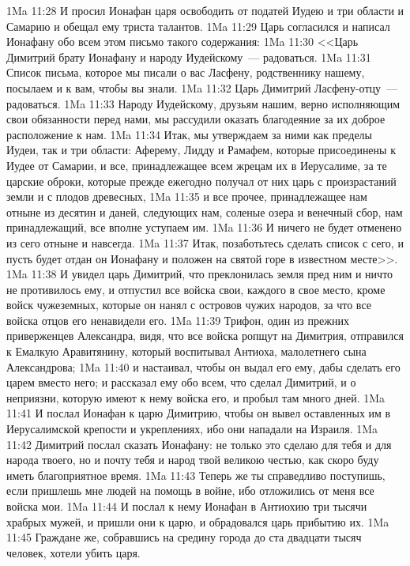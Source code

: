 \vs 1Ma 11:28 И просил Ионафан царя освободить от податей Иудею и три области и Самарию и обещал ему триста талантов.
\vs 1Ma 11:29 Царь согласился и написал Ионафану обо всем этом письмо такого содержания:
\vs 1Ma 11:30 <<Царь Димитрий брату Ионафану и народу Иудейскому~--- радоваться.
\vs 1Ma 11:31 Список письма, которое мы писали о вас Ласфену, родственнику нашему, посылаем и к вам, чтобы вы знали.
\vs 1Ma 11:32 Царь Димитрий Ласфену-отцу~--- радоваться.
\vs 1Ma 11:33 Народу Иудейскому, друзьям нашим, верно исполняющим свои обязанности перед нами, мы рассудили оказать благодеяние за их доброе расположение к нам.
\vs 1Ma 11:34 Итак, мы утверждаем за ними как пределы Иудеи, так и три области: Аферему, Лидду и Рамафем, которые присоединены к Иудее от Самарии, и все, принадлежащее всем жрецам их в Иерусалиме, за те царские оброки, которые прежде ежегодно получал от них царь с произрастаний земли и с плодов древесных,
\vs 1Ma 11:35 и все прочее, принадлежащее нам отныне из десятин и даней, следующих нам, соленые озера и венечный сбор, нам принадлежащий, все вполне уступаем им.
\vs 1Ma 11:36 И ничего не будет отменено из сего отныне и навсегда.
\vs 1Ma 11:37 Итак, позаботьтесь сделать список с сего, и пусть будет отдан он Ионафану и положен на святой горе в известном месте>>.
\rsbpar\vs 1Ma 11:38 И увидел царь Димитрий, что преклонилась земля пред ним и ничто не противилось ему, и отпустил все войска свои, каждого в свое место, кроме войск чужеземных, которые он нанял с островов чужих народов, за что все войска отцов его ненавидели его.
\vs 1Ma 11:39 Трифон, один из прежних приверженцев Александра, видя, что все войска ропщут на Димитрия, отправился к Емалкую Аравитянину, который воспитывал Антиоха, малолетнего сына Александрова;
\vs 1Ma 11:40 и настаивал, чтобы он выдал его ему, дабы сделать его царем вместо него; и рассказал ему обо всем, что сделал Димитрий, и о неприязни, которую имеют к нему войска его, и пробыл там много дней.
\rsbpar\vs 1Ma 11:41 И послал Ионафан к царю Димитрию, чтобы он вывел оставленных им в Иерусалимской крепости и укреплениях, ибо они нападали на Израиля.
\vs 1Ma 11:42 Димитрий послал сказать Ионафану: не только это сделаю для тебя и для народа твоего, но и почту тебя и народ твой великою честью, как скоро буду иметь благоприятное время.
\vs 1Ma 11:43 Теперь же ты справедливо поступишь, если пришлешь мне людей на помощь в войне, ибо отложились от меня все войска мои.
\vs 1Ma 11:44 И послал к нему Ионафан в Антиохию три тысячи храбрых мужей, и пришли они к царю, и обрадовался царь прибытию их.
\vs 1Ma 11:45 Граждане же, собравшись на средину города до ста двадцати тысяч человек, хотели убить царя.
